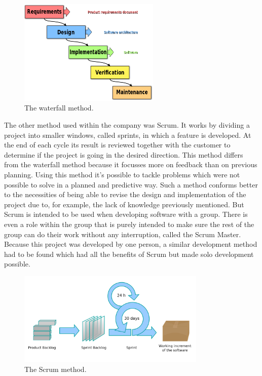\begin{figure}[ht]
    \centering
    \includegraphics[width=0.6\textwidth]{plaatjes/waterfall-method}
    \caption{The waterfall method.}
    \label{fig:waterfall-method}
\end{figure}%

The other method used within the company was Scrum. It works by dividing a project into smaller windows, called sprints, in which a feature is developed. At the end of each cycle its result is reviewed together with the customer to determine if the project is going in the desired direction. This method differs from the waterfall method because it focusses more on feedback than on previous planning. Using this method it's possible to tackle problems which were not possible to solve in a planned and predictive way. Such a method conforms better to the necessities of being able to revise the design and implementation of the project due to, for example, the lack of knowledge previously mentioned. But Scrum is intended to be used when developing software with a group. There is even a role within the group that is purely intended to make sure the rest of the group can do their work without any interruption, called the Scrum Master. Because this project was developed by one person, a similar development method had to be found which had all the benefits of Scrum but made solo development possible.

\begin{figure}[ht]
    \centering
    \includegraphics[width=0.8\textwidth]{plaatjes/scrum-method}
    \caption{The Scrum method.}
    \label{fig:waterfall-method}
\end{figure}%


